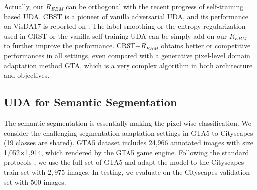 \documentclass[a4paper,conference]{IEEEtran}
\theoremstyle{plain}%
\begin{document}






Actually, our $R_{EBM}$ can be orthogonal with the recent progress of self-training based UDA. CBST \cite{Zou_2018_ECCV} is a pioneer of vanilla adversarial UDA, and its performance on VisDA17 is reported on \cite{zou2019confidence}. The label smoothing or the entropy regularization used in CRST \cite{zou2019confidence} or the vanilla self-training UDA \cite{Zou_2018_ECCV} can be simply add-on our $R_{EBM}$ to further improve the performance. CRST+$R_{EBM}$ obtains better or competitive performances in all settings, even compared with a generative pixel-level domain adaptation method GTA, which is a very complex algorithm in both architecture and objectives.





\subsection{UDA for Semantic Segmentation} 









The semantic segmentation is essentially making the pixel-wise classification. We consider the challenging segmentation adaptation settings in GTA5 \cite{richter2016playing} to Cityscapes (19 classes are shared). GTA5 dataset includes 24,966 annotated images with size 1,052$\times$1,914, which rendered by the GTA5 game engine. Following the standard protocols \cite{hoffman2018cycada,Tsai_adaptseg_2018}, we use the full set of GTA5 and adapt the model to the Cityscapes train set with $2,975$ images. In testing, we evaluate on the Cityscapes validation set with $500$ images. 
\end{document}
